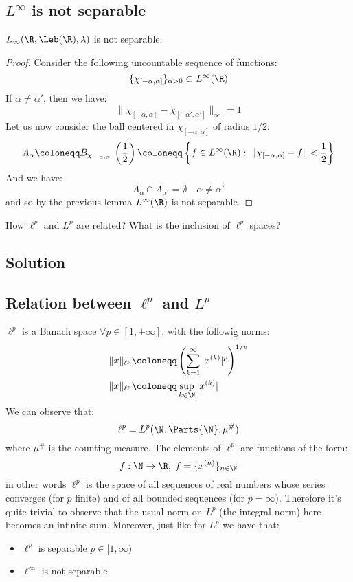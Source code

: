 
\subsection{\texorpdfstring{$L^\infty$}{L infinity} is not separable}
$L_\infty(\R, \Leb(\R), \lambda)$ is not separable.

\begin{proof}
    Consider the following  uncountable sequence of functions:
    \[ \{\chi_{[-\alpha,\alpha]}\}_{\alpha>0} \subset L^\infty(\R) \]
    If $\alpha\neq\alpha'$, then we have:
    \[ \| \chi_{[-\alpha,\alpha]} - \chi_{[-\alpha',\alpha']} \|_\infty = 1 \]
    Let us now consider the ball centered in $\chi_{[-\alpha,\alpha]}$ of radius $1/2$:
    \[ A_\alpha \coloneqq B_{\chi_{[-\alpha,\alpha]}}\left(\frac{1}{2}\right) \coloneqq \left\{ f\in L^\infty(\R): \; \|\chi_{[-\alpha,\alpha]}-f\|<\frac{1}{2} \right\}\] %
    And we have:
    \[ A_\alpha \cap A_{\alpha'} = \emptyset \quad \alpha \neq \alpha' \]
    and so by the previous lemma $L^\infty(\R)$ is not separable.
\end{proof}


\question
How $\ell^p$ and $L^p$ are related? What is the inclusion of $\ell^p$ spaces?

\subsection*{Solution}

\subsection{Relation between \texorpdfstring{$\ell^p$}{lp} and \texorpdfstring{$L^p$}{Lp}}
$\ell^p$ is a Banach space $\forall p \in [1,+\infty]$, with the followig norms:
\begin{align*}
    \|x\|_{\ell^p} & \coloneqq \left( \sum_{k=1}^\infty |x^{(k)}|^p \right)^{1/p} \\
    \|x\|_{\ell^p} & \coloneqq \sup_{k\in\N} |x^{(k)}| 
\end{align*}
We can observe that: 
\[ \ell^p = L^p (\N, \Parts{\N}, \mu^\#)\]
where $\mu^\#$ is the counting measure.
The elements of $\ell^p$ are functions of the form:
\[ f:\N\to\R, \; f=\{ x^{(n)} \}_{n\in\N} \]
in other words $\ell^p$ is the space of all sequences of real numbers whose series converges (for $p$ finite) and of all bounded sequences (for $p=\infty$).
Therefore it's quite trivial to observe that the usual norm on $L^p$ (the integral norm) here becomes an infinite sum.
Moreover, just like for $L^p$ we have that:
\begin{itemize}
    \item $\ell^p$ is separable $p\in[1,\infty)$
    \item $\ell^\infty$ is not separable
\end{itemize}

